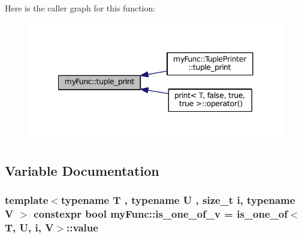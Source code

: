Here is the caller graph for this function\+:
\nopagebreak
\begin{figure}[H]
\begin{center}
\leavevmode
\includegraphics[width=341pt]{namespacemyFunc_a6588b7e742bf09aefea7d531f5c8ca6e_icgraph}
\end{center}
\end{figure}




\subsection{Variable Documentation}
\subsubsection[{\texorpdfstring{is\+\_\+one\+\_\+of\+\_\+v}{is_one_of_v}}]{\setlength{\rightskip}{0pt plus 5cm}template$<$typename T , typename U , size\+\_\+t i, typename V $>$ constexpr bool my\+Func\+::is\+\_\+one\+\_\+of\+\_\+v = {\bf is\+\_\+one\+\_\+of}$<$T, U, i, V$>$\+::value}\hypertarget{namespacemyFunc_aa757a804546f113b7cadf75b0a1ec7e1}{}\label{namespacemyFunc_aa757a804546f113b7cadf75b0a1ec7e1}
